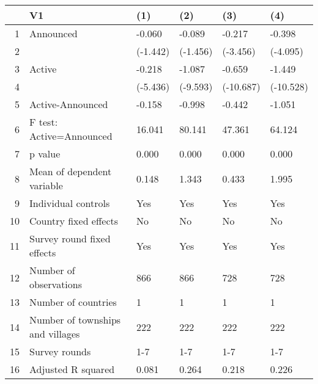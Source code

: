 \begin{table}[ht]
\centering
\begin{tabular}{rlllll}
  \hline
 & V1 & (1) & (2) & (3) & (4) \\ 
  \hline
1 & Announced & -0.060 & -0.089 & -0.217 & -0.398 \\ 
  2 &  & (-1.442) & (-1.456) & (-3.456) & (-4.095) \\ 
  3 & Active & -0.218 & -1.087 & -0.659 & -1.449 \\ 
  4 &  & (-5.436) & (-9.593) & (-10.687) & (-10.528) \\ 
  5 & Active-Announced & -0.158 & -0.998 & -0.442 & -1.051 \\ 
  6 & F test: Active=Announced & 16.041 & 80.141 & 47.361 & 64.124 \\ 
  7 & p value & 0.000 & 0.000 & 0.000 & 0.000 \\ 
  8 & Mean of dependent variable & 0.148 & 1.343 & 0.433 & 1.995 \\ 
  9 & Individual controls & Yes & Yes & Yes & Yes \\ 
  10 & Country fixed effects & No & No & No & No \\ 
  11 & Survey round fixed effects & Yes & Yes & Yes & Yes \\ 
  12 & Number of observations & 866 & 866 & 728 & 728 \\ 
  13 & Number of countries & 1 & 1 & 1 & 1 \\ 
  14 & Number of townships and villages & 222 & 222 & 222 & 222 \\ 
  15 & Survey rounds & 1-7 & 1-7 & 1-7 & 1-7 \\ 
  16 & Adjusted R squared & 0.081 & 0.264 & 0.218 & 0.226 \\ 
   \hline
\end{tabular}
\end{table}
